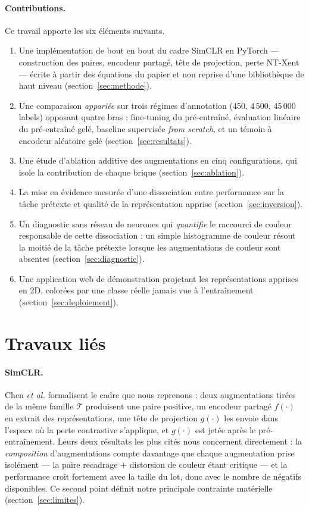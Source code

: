 \documentclass[11pt,a4paper]{article}
\begin{document}
\paragraph{Contributions.} Ce travail apporte les six éléments suivants.
\begin{enumerate}[label=(\roman*)]
\item Une implémentation de bout en bout du cadre SimCLR en PyTorch --- construction des
paires, encodeur partagé, tête de projection, perte NT-Xent --- écrite à partir des
équations du papier et non reprise d'une bibliothèque de haut niveau (section~\ref{sec:methode}).
\item Une comparaison \emph{appariée} sur trois régimes d'annotation (450, 4\,500,
45\,000 labels) opposant quatre bras : fine-tuning du pré-entraîné, évaluation linéaire du
pré-entraîné gelé, baseline supervisée \emph{from scratch}, et un témoin à encodeur
aléatoire gelé (section~\ref{sec:resultats}).
\item Une étude d'ablation additive des augmentations en cinq configurations, qui isole la
contribution de chaque brique (section~\ref{sec:ablation}).
\item La mise en évidence mesurée d'une dissociation entre performance sur la tâche
prétexte et qualité de la représentation apprise (section~\ref{sec:inversion}).
\item Un diagnostic sans réseau de neurones qui \emph{quantifie} le raccourci de couleur
responsable de cette dissociation : un simple histogramme de couleur résout la moitié de la
tâche prétexte lorsque les augmentations de couleur sont absentes
(section~\ref{sec:diagnostic}).
\item Une application web de démonstration projetant les représentations apprises en
2D, colorées par une classe réelle jamais vue à l'entraînement (section~\ref{sec:deploiement}).
\end{enumerate}

\section{Travaux liés}

\paragraph{SimCLR.} Chen \emph{et al.} \cite{chen2020simclr} formalisent le cadre que nous
reprenons : deux augmentations tirées de la même famille $\mathcal{T}$ produisent une paire
positive, un encodeur partagé $f(\cdot)$ en extrait des représentations, une tête de
projection $g(\cdot)$ les envoie dans l'espace où la perte contrastive s'applique, et
$g(\cdot)$ est jetée après le pré-entraînement. Leurs deux résultats les plus cités nous
concernent directement : la \emph{composition} d'augmentations compte davantage que chaque
augmentation prise isolément --- la paire recadrage $+$ distorsion de couleur étant
critique --- et la performance croît fortement avec la taille du lot, donc avec le nombre
de négatifs disponibles. Ce second point définit notre principale contrainte matérielle
(section~\ref{sec:limites}).
\end{document}
